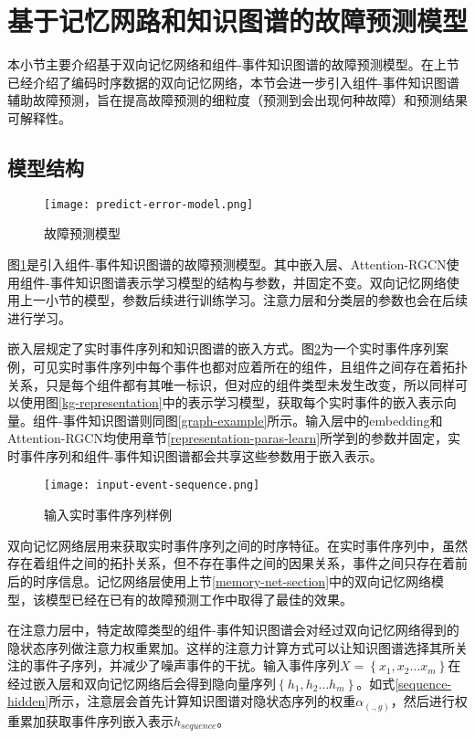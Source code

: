 \section{基于记忆网路和知识图谱的故障预测模型}
本小节主要介绍基于双向记忆网络和组件-事件知识图谱的故障预测模型。在上节已经介绍了编码时序数据的双向记忆网络，本节会进一步引入组件-事件知识图谱辅助故障预测，旨在提高故障预测的细粒度（预测到会出现何种故障）和预测结果可解释性。

\subsection{模型结构}
\begin{figure}[htbp]
    \centering
    \texttt{[image: predict-error-model.png]}
    \caption{故障预测模型\label{predict-error-model}}
\end{figure}
图\ref{predict-error-model}是引入组件-事件知识图谱的故障预测模型。其中嵌入层、Attention-RGCN使用组件-事件知识图谱表示学习模型的结构与参数，并固定不变。双向记忆网络使用上一小节的模型，参数后续进行训练学习。注意力层和分类层的参数也会在后续进行学习。

嵌入层规定了实时事件序列和知识图谱的嵌入方式。图\ref{input-event-sequence}为一个实时事件序列案例，可见实时事件序列中每个事件也都对应着所在的组件，且组件之间存在着拓扑关系，只是每个组件都有其唯一标识，但对应的组件类型未发生改变，所以同样可以使用图\ref{kg-representation}中的表示学习模型，获取每个实时事件的嵌入表示向量。组件-事件知识图谱则同图\ref{graph-example}所示。输入层中的embedding和Attention-RGCN均使用章节\ref{representation-paras-learn}所学到的参数并固定，实时事件序列和组件-事件知识图谱都会共享这些参数用于嵌入表示。
\begin{figure}[htbp]
    \centering
    \texttt{[image: input-event-sequence.png]}
    \caption{输入实时事件序列样例\label{input-event-sequence}}
\end{figure}

双向记忆网络层用来获取实时事件序列之间的时序特征。在实时事件序列中，虽然存在着组件之间的拓扑关系，但不存在事件之间的因果关系，事件之间只存在着前后的时序信息。记忆网络层使用上节\ref{memory-net-section}中的双向记忆网络模型，该模型已经在已有的故障预测工作中取得了最佳的效果。

在注意力层中，特定故障类型的组件-事件知识图谱会对经过双向记忆网络得到的隐状态序列做注意力权重累加。这样的注意力计算方式可以让知识图谱选择其所关注的事件子序列，并减少了噪声事件的干扰。输入事件序列$X=\left\{x_{1}, x_{2} \ldots x_{m}\right\}$在经过嵌入层和双向记忆网络后会得到隐向量序列$\left\{h_{1}, h_{2} \ldots h_{m}\right\}$。如式\ref{sequence-hidden}所示，注意层会首先计算知识图谱对隐状态序列的权重$\alpha_{(. , g)}$，然后进行权重累加获取事件序列嵌入表示$h_{sequence}$。

